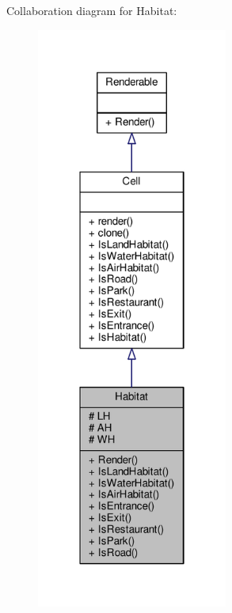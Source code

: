 Collaboration diagram for Habitat\+:
\nopagebreak
\begin{figure}[H]
\begin{center}
\leavevmode
\includegraphics[width=178pt]{classHabitat__coll__graph}
\end{center}
\end{figure}
